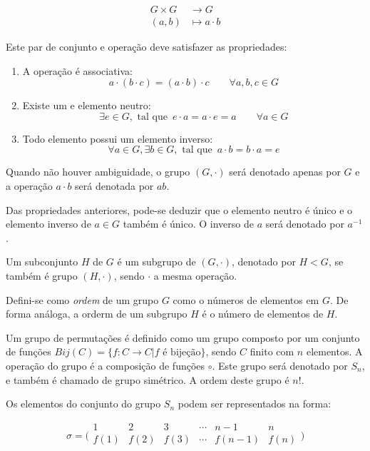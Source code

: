 \documentclass[a4paper,10pt,onecolumn]{article}
\begin{document}
\begin{align*} G \times G & \rightarrow G \\ (a,b) & \mapsto a \cdot b
\end{align*}

  Este par de conjunto e operação deve satisfazer as propriedades:
\begin{enumerate}
\item A operação é associativa:\\
  $$ a \cdot ( b \cdot c) = ( a \cdot b) \cdot c \qquad \forall a,b,c \in G$$
\item Existe um e elemento neutro:\\
  $$ \exists e \in G, \textrm{ tal que }\, e \cdot a = a \cdot e = a \qquad \forall a \in G $$
\item Todo elemento possui um elemento inverso:\\
  $$ \forall a \in G, \exists b \in G,\textrm{ tal que }\, a \cdot b = b \cdot a = e $$
\end{enumerate}

Quando não houver ambiguidade, o grupo $(G,\cdot)$ será denotado apenas por
$G$ e a operação $a\cdot b$ será denotada por $ab$.

Das propriedades anteriores, pode-se deduzir que o elemento neutro é único e o
elemento inverso de $a \in G$ também é único.  O inverso de $a$ será denotado
por $a^{-1}$.

Um subconjunto $H$ de $G$ é um subgrupo de $(G,\cdot)$, denotado por $H < G$,
se também é grupo $(H,\cdot)$, sendo $\cdot$ a mesma operação.

Defini-se como \emph{ordem} de um grupo $G$ como o números de elementos em
$G$.  De forma análoga, a orderm de um subgrupo $H$ é o número de elementos de $H$.

Um grupo de permutações é definido como um grupo composto por um conjunto de
funções $Bij(C) = \{ f:C \rightarrow C| f \textrm{ é bijeção}\}$, sendo $C$
finito com $n$ elementos. A operação do grupo é a composição de funções
$\circ$.  Este grupo será denotado por $S_n$, e também é chamado de grupo
simétrico. A ordem deste grupo é $n!$.

Os elementos do conjunto do grupo $S_n$ podem ser representados na forma:

\begin{displaymath} \sigma= \bigl(
    \begin{smallmatrix} 1 & 2& 3& \cdots &n-1 &n \\ f(1) & f(2)& f(3)& \cdots
&f(n-1) &f(n) \\
    \end{smallmatrix} \bigr)
\end{displaymath}
\end{document}
